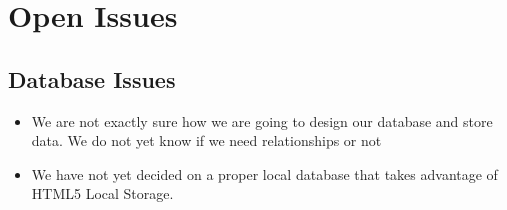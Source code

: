 \documentclass[11pt,fleqn]{book} %
\begin{document}
	
	
	\chapter{Open Issues}
	
	\section{Database Issues}
	\begin{itemize}
		\item We are not exactly sure how we are going to design our database and store data. We do not yet know if we need relationships or not
		\item We have not yet decided on a proper local database that takes advantage of HTML5 Local Storage.
	\end{itemize}
	
\end{document}
